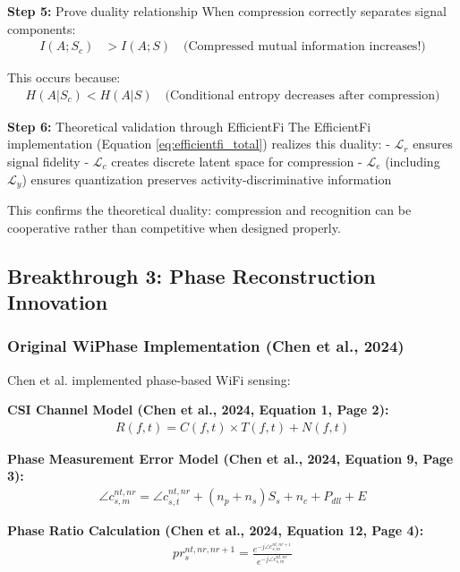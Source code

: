 \documentclass[12pt,a4paper]{article}
\begin{document}
\textbf{Step 5:} Prove duality relationship
When compression correctly separates signal components:
\begin{align}
I(A;S_c) &> I(A;S) \quad \text{(Compressed mutual information increases!)} \label{eq:duality_theorem}
\end{align}

This occurs because:
\begin{align}
H(A|S_c) < H(A|S) \quad \text{(Conditional entropy decreases after compression)} \label{eq:conditional_entropy_reduction}
\end{align}

\textbf{Step 6:} Theoretical validation through EfficientFi
The EfficientFi implementation (Equation \ref{eq:efficientfi_total}) realizes this duality:
- $\mathcal{L}_r$ ensures signal fidelity
- $\mathcal{L}_c$ creates discrete latent space for compression
- $\mathcal{L}_e$ (including $\mathcal{L}_y$) ensures quantization preserves activity-discriminative information

This confirms the theoretical duality: compression and recognition can be cooperative rather than competitive when designed properly.

\subsection{Breakthrough 3: Phase Reconstruction Innovation}

\subsubsection{Original WiPhase Implementation (Chen et al., 2024)}

Chen et al. \cite{chen2024wiphase} implemented phase-based WiFi sensing:

\textbf{CSI Channel Model (Chen et al., 2024, Equation 1, Page 2):}
\begin{align}
R(f, t) = C(f, t) \times T(f, t) + N(f, t) \label{eq:wiphase_channel_model}
\end{align}

\textbf{Phase Measurement Error Model (Chen et al., 2024, Equation 9, Page 3):}
\begin{align}
\angle c_{s,m}^{nt,nr} = \angle c_{s,t}^{nt,nr} + (n_p + n_s)S_s + n_c + P_{dll} + E \label{eq:wiphase_phase_error}
\end{align}

\textbf{Phase Ratio Calculation (Chen et al., 2024, Equation 12, Page 4):}
\begin{align}
pr_s^{nt,nr,nr+1} = \frac{e^{-j\angle c_{s,m}^{nt,nr+1}}}{e^{-j\angle c_{s,m}^{nt,nr}}} \label{eq:wiphase_phase_ratio}
\end{align}
\end{document}
